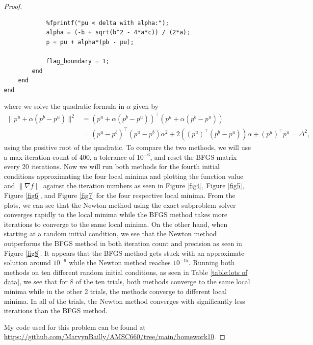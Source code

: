 \documentclass[12pt]{report}
\begin{document}
\begin{problem}
\begin{proof}
\begin{lstlisting}[style=Matlab-editor]
            % get alpha
            %fprintf("pu < delta with alpha:");
            alpha = (-b + sqrt(b^2 - 4*a*c)) / (2*a);
            p = pu + alpha*(pb - pu);

            flag_boundary = 1;
        end
    end
end
\end{lstlisting}
where we solve the quadratic formula in $\alpha$ given by
\begin{align*}
    \|p^u + \alpha(p^b - p^u)\|^2 &= (p^u + \alpha(p^b - p^u))^\top(p^u + \alpha(p^b - p^u))\\
    &= (p^u - p^b)^\top(p^u - p^b)\alpha^2 + 2((p^u)^\top(p^b - p^u))\alpha + (p^u)^\top p^u = \Delta^2,
\end{align*}
using the positive root of the quadratic. To compare the two methods, we will use a max iteration count of 400, a tolerance of $10^{-6}$, and reset the BFGS matrix every 20 iterations. Now we will run both methods for the fourth initial conditions approximating the four local minima and plotting the function value and $\|\nabla f\|$ against the iteration numbers as seen in Figure \ref{fig4}, Figure \ref{fig5}, Figure \ref{fig6}, and Figure \ref{fig7} for the four respective local minima. From the plots, we can see that the Newton method using the exact subproblem solver converges rapidly to the local minima while the BFGS method takes more iterations to converge to the same local minima. On the other hand, when starting at a random initial condition, we see that the Newton method outperforms the BFGS method in both iteration count and precision as seen in Figure \ref{fig8}. It appears that the BFGS method gets stuck with an approximate solution around $10^{-6}$ while the Newton method reaches $10^{-15}$. Running both methods on ten different random initial conditions, as seen in Table \ref{table:lots of data}, we see that for 8 of the ten trials, both methods converge to the same local minima while in the other 2 trials, the methods converge to different local minima. In all of the trials, the Newton method converges with significantly less iterations than the BFGS method.






My code used for this problem can be found at \url{https://github.com/MarvynBailly/AMSC660/tree/main/homework10}.


\end{proof}
\end{problem}
\end{document}
